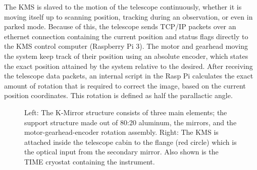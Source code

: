 \documentclass[manuscript]{aastex}
\begin{document}
The KMS is slaved to the motion of the telescope continuously, whether it is moving itself up to scanning position, tracking during an observation, or even in parked mode. Because of this, the telescope sends TCP/IP packets over an ethernet connection containing the current position and status flags directly to the KMS control computer ({\sc Raspberry Pi 3}). The motor and gearhead moving the system keep track of their position using an absolute encoder, which states the exact position attained by the system relative to the desired. After receiving the telescope data packets, an internal script in the Rasp Pi calculates the exact amount of rotation that is required to correct the image, based on the current position coordinates. This rotation is defined as half the parallactic angle.

\begin{figure}[H]
	\centering
	\qquad
	\singlespace
	\caption[CAD Model of the K-Mirror Structure.]{Left: The K-Mirror structure consists of three main elements; the support structure made out of 80:20 aluminum, the mirrors, and the motor-gearhead-encoder rotation assembly. Right: The KMS is attached inside the telescope cabin to the flange (red circle) which is the optical input from the secondary mirror. Also shown is the TIME cryostat containing the instrument.}%
	\label{fig:km23}%
\end{figure}
\end{document}
